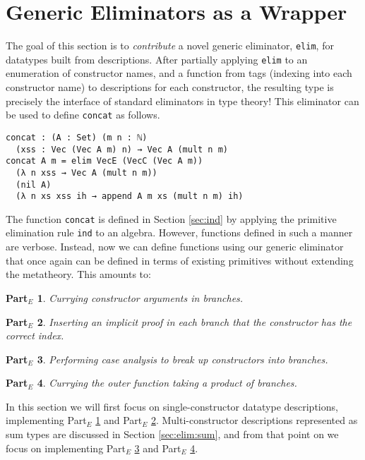 \documentclass[preprint,nonatbib]{sigplanconf}
\newtheorem{myparte}{Part$_E$}
\newcommand{\refsec}[1]{Section \ref{sec:#1}}
\newcommand{\refparte}[1]{Part$_E$ \ref{parte:#1}}
\begin{document}
\section{Generic Eliminators as a Wrapper}
\label{sec:elim}

The goal of this section is to {\it contribute} a novel generic
eliminator, {\tt elim}, for datatypes built from descriptions.
After partially applying {\tt elim} to an enumeration of constructor
names, and a function from tags (indexing into each constructor name)
to descriptions for each constructor, the resulting type is precisely
the interface of standard eliminators in type theory!  This eliminator can
be used to define {\tt concat} as follows.

\begin{verbatim}
concat : (A : Set) (m n : ℕ)
  (xss : Vec (Vec A m) n) → Vec A (mult n m)
concat A m = elim VecE (VecC (Vec A m))
  (λ n xss → Vec A (mult n m))
  (nil A)
  (λ n xs xss ih → append A m xs (mult n m) ih)
\end{verbatim}

The function {\tt concat} is defined in \refsec{ind} by applying the
primitive elimination rule {\tt ind} to an algebra. However,
functions defined in such a manner are verbose. Instead, now we
can define functions using our generic eliminator that once again can
be defined in terms of existing primitives without extending the
metatheory. This amounts to:

\begin{myparte}
\label{parte:one}
Currying constructor arguments in branches.
\end{myparte}

\begin{myparte}
\label{parte:two}
Inserting an implicit proof in each branch that the constructor has the correct index.
\end{myparte}

\begin{myparte}
\label{parte:three}
Performing case analysis to break up constructors into branches.
\end{myparte}

\begin{myparte}
\label{parte:four}
Currying the outer function taking a product of branches.
\end{myparte}

In this section we will first focus on single-constructor
datatype descriptions, implementing \refparte{one} and \refparte{two}.
Multi-constructor descriptions represented as sum types are
discussed in \refsec{elim:sum}, and from that point on we focus on
implementing \refparte{three} and \refparte{four}.
\end{document}
